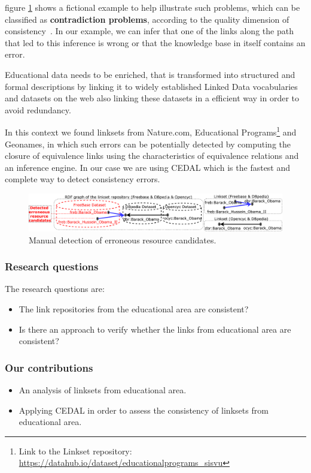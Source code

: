 figure \ref{fig:example} shows a fictional example to help illustrate such problems, which can be classified as \textbf{contradiction problems}, according to the quality dimension of consistency~\cite{zaveri2015quality}. 
In our example, we can infer that one of the links along the path that led to this inference is wrong or that the knowledge base in itself contains an error. 

Educational data needs to be enriched, that is transformed into structured and formal descriptions by linking it to widely established Linked Data vocabularies and datasets on the web also linking these datasets in a efficient way in order to avoid redundancy.

In this context we found linksets from Nature.com, Educational Programs\footnote{Link to the Linkset repository: \url{https://datahub.io/dataset/educationalprograms_sisvu}} and Geonames, in which such errors can be potentially detected by computing the closure of equivalence links using the characteristics of equivalence relations and an inference engine. In our case we are using CEDAL \cite{cedal2017} which is the fastest and complete way to detect consistency errors. 

\begin{figure}[htb] 
	\centering
	\includegraphics[width=1.0\linewidth]{img/example8.pdf}
	\caption{Manual detection of erroneous resource candidates.}
	\label{fig:example}
\end{figure} 

\subsubsection{Research questions}

The research questions are:
\begin{itemize}
    \item The link repositories from the educational area are consistent?
    \item Is there an approach to verify whether the links from educational area are consistent?
\end{itemize}


\subsubsection{Our contributions}
\begin{itemize}
    \item An analysis of linksets from educational area.
    \item Applying CEDAL\cite{valdestilhas2017cedal} in order to assess the consistency of linksets from educational area.
\end{itemize}

